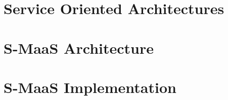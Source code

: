 

\section{Service Oriented Architectures}\label{sec:smaas:background}



\section{S-MaaS Architecture}\label{sec:smaas:arch}



\section{S-MaaS Implementation}\label{sec:smaas:impl}













